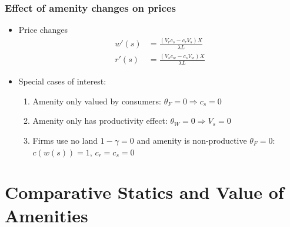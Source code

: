 \documentclass[11pt,notes=hide,aspectratio=169]{beamer}
\begin{document}
\begin{frame}
\frametitle{Effect of amenity changes on prices}
\begin{itemize}
\item Price changes
\begin{align*}
w'(s) &= \frac{(V_rc_s - c_rV_s) X}{ \lambda L} \\
r'(s) &= \frac{(V_sc_w - c_sV_w) X}{ \lambda L} 
\end{align*}
\item Special cases of interest:
\begin{enumerate}
\item Amenity only valued by consumers: $\theta_F=0 \Rightarrow c_s = 0$
\item Amenity only has productivity effect: $\theta_W=0 \Rightarrow  V_s = 0$
\item Firms use no land $1-\gamma=0$ and amenity is non-productive $\theta_F=0$: $c(w(s))=1$, $c_r = c_s = 0$
\end{enumerate}
\end{itemize}
\end{frame}
\section{Comparative Statics and Value of Amenities}
\end{document}
